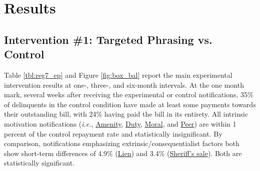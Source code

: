 \documentclass[12pt,titlepage]{article}
\begin{document}
\section{Results}

\subsection{Intervention \#1: Targeted Phrasing vs. Control}

Table \ref{tbl:reg7_ep} and Figure \ref{fig:box_bal} report the main 
experimental intervention results at one-, three-, and six-month 
intervals. At the one month mark, several weeks after receiving the 
experimental or control notifications, 35\% of delinquents in the 
control condition have made at least some payments towards their 
outstanding bill, with 24\% having paid the bill in its entirety. All 
intrinsic motivation notifications (\textit{i.e.}, \hyperlink{amenities}{Amenity}, 
\hyperlink{duty}{Duty}, \hyperlink{moral}{Moral}, and \hyperlink{peer}{Peer}) 
are within 1 percent of the control repayment rate and 
statistically insignificant. By comparison, notifications emphasizing 
extrinsic/consequentialist factors both show short-term differences of 
4.9\% (\hyperlink{lien}{Lien}) and 3.4\% (\hyperlink{sheriff}{Sheriff's sale}). 
Both are statistically significant. 
\end{document}

